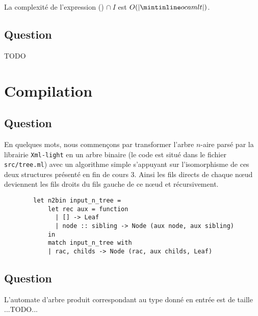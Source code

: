 \documentclass[twoside,12pt]{article}
\begin{document}
La complexité de l'expression () $\cap\ I$ est $O(|\ocaml{t}|)$.

\subsection{Question} TODO


\section{Compilation}
\subsection{Question}
En quelques mots, nous commençons par transformer l'arbre $n$-aire parsé
par la librairie \texttt{Xml-light} en un arbre binaire (le code est situé
dans le fichier \texttt{src/tree.ml}) avec un algorithme simple s'appuyant
sur l'isomorphisme de ces deux structures présenté en fin de cours 3. Ainsi
les fils directs de chaque n\oe{}ud deviennent les fils droits du fils gauche
de ce n\oe{}ud et récursivement.

\begin{verbatim}
        let n2bin input_n_tree =
            let rec aux = function
              | [] -> Leaf
              | node :: sibling -> Node (aux node, aux sibling)
            in
            match input_n_tree with
            | rac, childs -> Node (rac, aux childs, Leaf)
\end{verbatim}


\subsection{Question}
L'automate d'arbre produit correspondant au type donné en entrée est de taille ...TODO...
\end{document}
